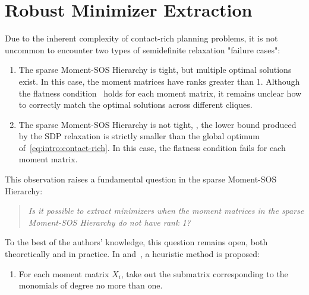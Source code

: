 
\section{Robust Minimizer Extraction}
\label{sec:robust-extraction}

Due to the inherent complexity of contact-rich planning problems, it is not uncommon to encounter two types of semidefinite relaxation "failure cases":  
\begin{enumerate}
    \item The sparse Moment-SOS Hierarchy is tight, but multiple optimal solutions exist. In this case, the moment matrices have ranks greater than 1. Although the flatness condition~\cite{henrion2005springer-detecting-global-optimal-extraction-solutions} holds for each moment matrix, it remains unclear how to correctly match the optimal solutions across different cliques.
    \item The sparse Moment-SOS Hierarchy is not tight, \ie, the lower bound produced by the SDP relaxation is strictly smaller than the global optimum of~\eqref{eq:intro:contact-rich}. In this case, the flatness condition fails for each moment matrix.
\end{enumerate}

This observation raises a fundamental question in the sparse Moment-SOS Hierarchy:

\begin{quote}
\textit{Is it possible to extract minimizers when the moment matrices in the sparse Moment-SOS Hierarchy do not have rank 1?}
\end{quote}

To the best of the authors' knowledge, this question remains open, both theoretically and in practice. In \tssos and~\cite{kang2024wafr-strom}, a heuristic method is proposed:
\begin{enumerate}
    \item For each moment matrix $X_i$, take out the submatrix corresponding to the monomials of degree no more than one. 
\end{enumerate}

